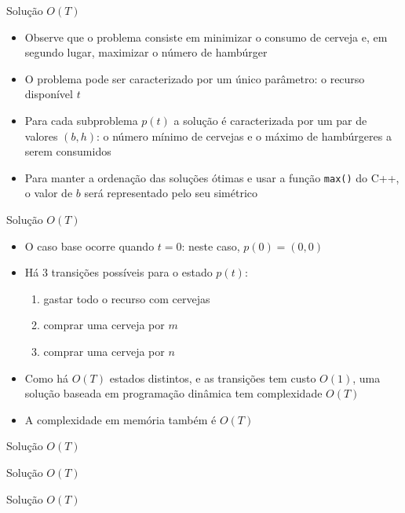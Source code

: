 \begin{frame}[fragile]{Solução $O(T)$}

    \begin{itemize}
        \item Observe que o problema consiste em minimizar o consumo de cerveja e, em segundo lugar,
            maximizar o número de hambúrger

        \item O problema pode ser caracterizado por um único parâmetro: o recurso disponível
            $t$
        
        \item Para cada subproblema $p(t)$ a solução é caracterizada por um par de valores
            $(b, h)$: o número mínimo de cervejas e o máximo de hambúrgeres a serem consumidos 

        \item Para manter a ordenação das soluções ótimas e usar a função \texttt{max()} do 
            C++, o valor de $b$ será representado pelo seu simétrico
   \end{itemize}

\end{frame}

\begin{frame}[fragile]{Solução $O(T)$}

    \begin{itemize}
        \item O caso base ocorre quando $t = 0$: neste caso, $p(0) = (0, 0)$
            
        \item Há 3 transições possíveis para o estado $p(t)$:

        \begin{enumerate}
            \item gastar todo o recurso com cervejas
            \item comprar uma cerveja por $m$
            \item comprar uma cerveja por $n$
        \end{enumerate}

        \item Como há $O(T)$ estados distintos, e as transições tem custo $O(1)$, uma solução
            baseada em programação dinâmica tem complexidade $O(T)$

        \item A complexidade em memória também é $O(T)$
   \end{itemize}

\end{frame}

\begin{frame}[fragile]{Solução $O(T)$}
\end{frame}

\begin{frame}[fragile]{Solução $O(T)$}
\end{frame}

\begin{frame}[fragile]{Solução $O(T)$}
\end{frame}
